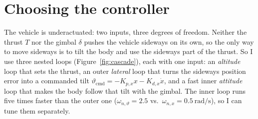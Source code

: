 \documentclass[11pt]{article}
\begin{document}
\section*{Choosing the controller}
The vehicle is underactuated: two inputs, three degrees of freedom. Neither the thrust $T$ nor the gimbal $\delta$ pushes the vehicle sideways on its own, so the only way to move sideways is to tilt the body and use the sideways part of the thrust. So I use three nested loops (Figure~\ref{fig:cascade}), each with one input: an \emph{altitude} loop that sets the thrust, an outer \emph{lateral} loop that turns the sideways position error into a commanded tilt $\vartheta_{\mathrm{cmd}}=-K_{p,x}x-K_{d,x}\dot x$, and a fast inner \emph{attitude} loop that makes the body follow that tilt with the gimbal. The inner loop runs five times faster than the outer one ($\omega_{n,\vartheta}=2.5$ vs.\ $\omega_{n,x}=0.5~\mathrm{rad/s}$), so I can tune them separately.
\end{document}
